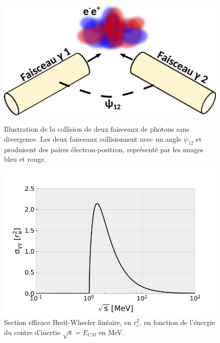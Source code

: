 \begin{refsection}
\begin{figure}[t]
    \begin{minipage}[b]{0.4\linewidth}
    	\centering
    	\includegraphics[width=\linewidth]{5-opti_theorique/beam-beam_collision.png}
    	\caption{Illustration de la collision de deux faisceaux de photons sans divergence. Les deux faisceaux collisionnent avec un angle $\psi_{12}$ et produisent des paires électron-positron, représenté par les nuages bleu et rouge.}
    	\label{fig:51-collision_faisceaux}
    \end{minipage}
    \hfill
    \begin{minipage}[b]{0.5\linewidth}
    	\centering
    	\includegraphics[width=\linewidth]{5-opti_theorique/LBW_cross_section.png}
    	\caption{Section efficace Breit-Wheeler linéaire, en $r_e^2$, en fonction de l'énergie du centre d'inertie $\sqrt{s}=E_{CM}$ en MeV.}
    	\label{fig:51-sigma_BWL}
    \end{minipage}
\end{figure}


\end{refsection}

